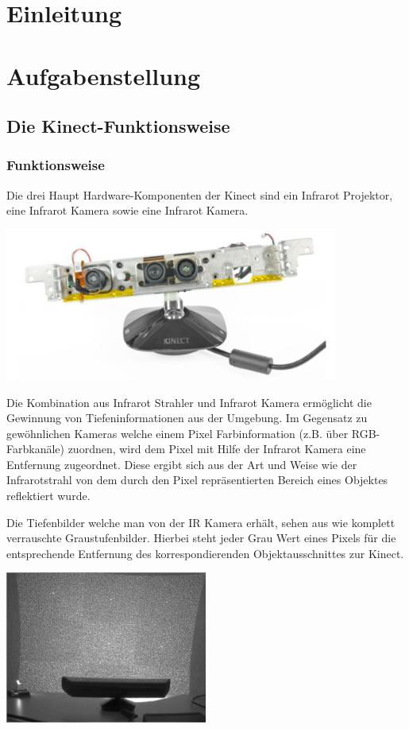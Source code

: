 \documentclass[appendixprefix,a4paper,bibliography=totoc,twoside=true,11pt,DIV=11,BCOR=6mm,headsepline,pointlessnumbers]{scrbook}
\begin{document}

\maketitle
\chapter{Einleitung}
\chapter{Aufgabenstellung}
\section{Die Kinect-Funktionsweise}
\subsection{Funktionsweise}
Die drei Haupt Hardware-Komponenten der Kinect sind ein Infrarot Projektor, eine Infrarot Kamera sowie eine Infrarot Kamera.

\includegraphics[height=5cm]{Res/Kinect_Components.png}



Die Kombination aus Infrarot Strahler und Infrarot Kamera ermöglicht die Gewinnung von Tiefeninformationen aus der Umgebung. Im Gegensatz zu gewöhnlichen Kameras welche einem Pixel Farbinformation (z.B.  über RGB-Farbkanäle) zuordnen, wird dem Pixel mit Hilfe der Infrarot Kamera eine Entfernung zugeordnet. Diese ergibt sich aus der Art und Weise wie der Infrarotstrahl von dem durch den Pixel repräsentierten Bereich eines Objektes reflektiert wurde.

Die Tiefenbilder welche man von der IR Kamera erhält, sehen aus wie komplett verrauschte Graustufenbilder. Hierbei steht jeder Grau Wert eines Pixels für die entsprechende Entfernung des korrespondierenden Objektausschnittes zur Kinect.



\includegraphics[height=5cm]{Res/Kinect_9Points.png}
\end{document}
